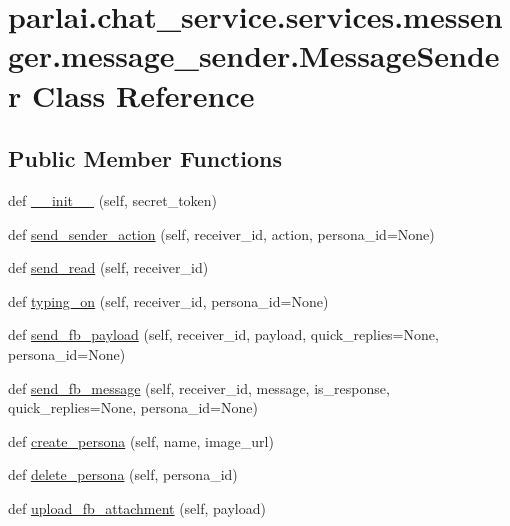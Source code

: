 \hypertarget{classparlai_1_1chat__service_1_1services_1_1messenger_1_1message__sender_1_1MessageSender}{}\section{parlai.\+chat\+\_\+service.\+services.\+messenger.\+message\+\_\+sender.\+Message\+Sender Class Reference}
\label{classparlai_1_1chat__service_1_1services_1_1messenger_1_1message__sender_1_1MessageSender}
\subsection*{Public Member Functions}
\begin{DoxyCompactItemize}
\item 
def \hyperlink{classparlai_1_1chat__service_1_1services_1_1messenger_1_1message__sender_1_1MessageSender_aaedf425b46271ec9c4b36f4b01914496}{\+\_\+\+\_\+init\+\_\+\+\_\+} (self, secret\+\_\+token)
\item 
def \hyperlink{classparlai_1_1chat__service_1_1services_1_1messenger_1_1message__sender_1_1MessageSender_a09b98552efb831c4066b1dd376de956d}{send\+\_\+sender\+\_\+action} (self, receiver\+\_\+id, action, persona\+\_\+id=None)
\item 
def \hyperlink{classparlai_1_1chat__service_1_1services_1_1messenger_1_1message__sender_1_1MessageSender_a69771368344f7fa86ab28bb0ad2a61e5}{send\+\_\+read} (self, receiver\+\_\+id)
\item 
def \hyperlink{classparlai_1_1chat__service_1_1services_1_1messenger_1_1message__sender_1_1MessageSender_ade12174a453cd019fefc4aed2f811fd5}{typing\+\_\+on} (self, receiver\+\_\+id, persona\+\_\+id=None)
\item 
def \hyperlink{classparlai_1_1chat__service_1_1services_1_1messenger_1_1message__sender_1_1MessageSender_a7ed82af2bbe053084c457da301fb9759}{send\+\_\+fb\+\_\+payload} (self, receiver\+\_\+id, payload, quick\+\_\+replies=None, persona\+\_\+id=None)
\item 
def \hyperlink{classparlai_1_1chat__service_1_1services_1_1messenger_1_1message__sender_1_1MessageSender_af4854bc64730dc49290816a6d3da2541}{send\+\_\+fb\+\_\+message} (self, receiver\+\_\+id, message, is\+\_\+response, quick\+\_\+replies=None, persona\+\_\+id=None)
\item 
def \hyperlink{classparlai_1_1chat__service_1_1services_1_1messenger_1_1message__sender_1_1MessageSender_abd0bb6dbaec08355b16c4df8e9e72e2f}{create\+\_\+persona} (self, name, image\+\_\+url)
\item 
def \hyperlink{classparlai_1_1chat__service_1_1services_1_1messenger_1_1message__sender_1_1MessageSender_a511cc34a215c25dfeed69810523eb8e4}{delete\+\_\+persona} (self, persona\+\_\+id)
\item 
def \hyperlink{classparlai_1_1chat__service_1_1services_1_1messenger_1_1message__sender_1_1MessageSender_a7b12a4f091ba64baa59c0749f8531190}{upload\+\_\+fb\+\_\+attachment} (self, payload)
\end{DoxyCompactItemize}
